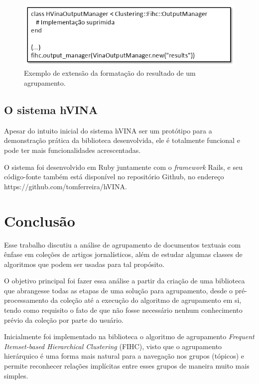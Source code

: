 \documentclass[a4paper,12pt]{article}
\begin{document}
\begin{figure}[H]
    \begin{center}
        \includegraphics[scale=0.6]{exemplo_formatacao.png}
    \end{center}
    \caption{Exemplo de extensão da formatação do resultado de um agrupamento.}
    \label{fig:exemplo_formatacao}
\end{figure}

\subsection {O sistema hVINA}
\label {sec:o_sistema_hvina}

Apesar do intuito inicial do sistema hVINA ser um protótipo para a demonstração prática da biblioteca desenvolvida, ele é totalmente funcional e pode ter mais funcionalidades acrescentadas. 

O sistema foi desenvolvido em Ruby juntamente com o \emph{framework} Rails, e seu código-fonte também está disponível no repositório Github, no endereço https://github.com/tomferreira/hVINA.


\newpage

\section {Conclusão}
\label {sec:conclusao}

Esse trabalho discutiu a análise de agrupamento de documentos textuais com ênfase em coleções de artigos jornalísticos, além de estudar algumas classes de algoritmos que podem ser usadas para tal propósito.

O objetivo principal foi fazer essa análise a partir da criação de uma biblioteca que abrangesse todas as etapas de uma solução para agrupamento, desde o pré-processamento da coleção até a execução do algoritmo de agrupamento em si, tendo como requisito o fato de que não fosse necessário nenhum conhecimento prévio da coleção por parte do usuário.

Inicialmente foi implementado na biblioteca o algoritmo de agrupamento \textit{Frequent Itemset-based Hierarchical Clustering} (FIHC), visto que o agrupamento hierárquico é uma forma mais natural para a navegação nos grupos (tópicos) e permite reconhecer relações implícitas entre esses grupos de maneira muito mais simples.
\end{document}
